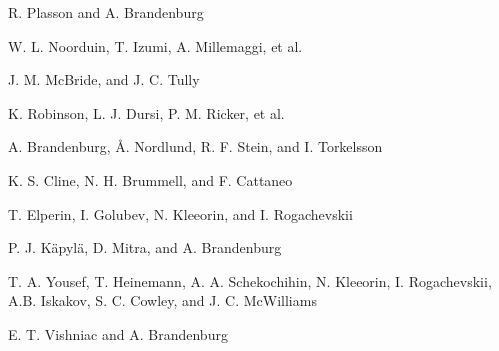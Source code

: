\documentclass[twocolumn,showpacs,preprintnumbers,superscriptaddress]{revtex4}
\begin{document}
\begin{thebibliography}{}
R. Plasson and A. Brandenburg

W. L. Noorduin, T. Izumi, A. Millemaggi, et al.

J. M. McBride, and J. C. Tully

K. Robinson, L. J. Dursi, P. M. Ricker, et al.

A. Brandenburg, \AA. Nordlund, R. F. Stein, and I. Torkelsson

K. S. Cline, N. H. Brummell, and F. Cattaneo

T. Elperin, I. Golubev, N. Kleeorin, and I. Rogachevskii

P. J. K\"apyl\"a, D. Mitra, and A. Brandenburg

T. A. Yousef, T. Heinemann, A. A. Schekochihin, N. Kleeorin, I. Rogachevskii, A.B. Iskakov, S. C. Cowley, and J. C. McWilliams

E. T. Vishniac and A. Brandenburg
\end{thebibliography}
\end{document}
